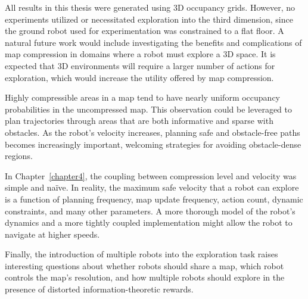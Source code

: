All results in this thesis were generated using 3D occupancy grids. However, no
experiments utilized or necessitated exploration into the third dimension, since
the ground robot used for experimentation was constrained to a flat floor. A natural
future work would include investigating the benefits and complications of map compression
in domains where a robot must explore a 3D space. It is expected that 3D
environments will require a larger number of actions for exploration, which
would increase the utility offered by map compression.

Highly compressible areas in a map tend to have nearly uniform
occupancy probabilities in the uncompressed map. This observation could be leveraged to plan
trajectories through areas that are both informative and sparse with obstacles.
As the robot's velocity increases, planning safe and obstacle-free paths becomes
increasingly important, welcoming strategies for avoiding obstacle-dense regions.

In Chapter~\ref{chapter4}, the coupling between compression level and velocity
was simple and na\"{i}ve. In reality, the maximum safe velocity that a robot can
explore is a function of planning frequency, map update frequency, action count,
dynamic constraints, and many other parameters. A more thorough model of the robot's dynamics and
a more tightly coupled implementation might allow the robot to navigate at
higher speeds.

Finally, the introduction of multiple robots into the exploration task raises interesting
questions about whether robots should share a map, which robot controls the
map's resolution, and how multiple robots should explore in the presence of distorted
information-theoretic rewards.
